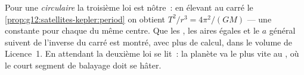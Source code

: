 \begin{remark}\label{rem:g12:satellites-kepler:proof}
Pour une  \emph{circulaire} la troisième loi
est nôtre~: en élevant au carré le
\cref{prop:g12:satellites-kepler:period} on obtient
$T^2/r^3 = 4\pi^2/(GM)$ --- une constante pour chaque
 du même centre. Que les
, les aires égales et le $a$ général
suivent de l'inverse du carré est montré, avec plus de calcul, dans le
volume de Licence~1. En attendant la deuxième loi se lit~: la planète
va le plus vite au , où le court segment de
balayage doit se hâter.
\end{remark}


